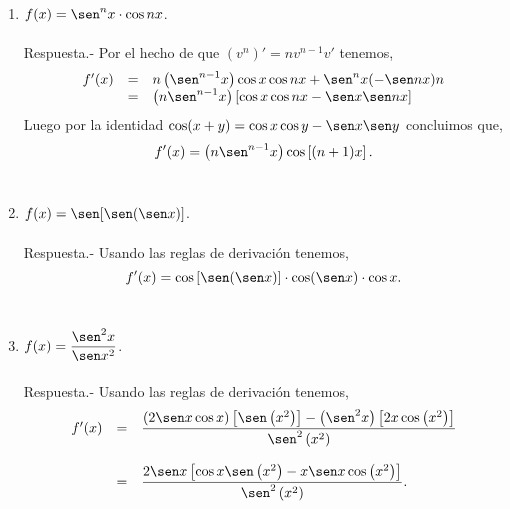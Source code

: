 \begin{enumerate}[\bfseries 1.]
    \item $f(x)=\sen^n x \cdot \cos nx$.\\\\
	Respuesta.- \; Por el hecho de que $(v^n)'=nv^{n-1}v'$ tenemos,
	$$\begin{array}{rcl}
	    f'(x)&=&n\left(\sen^{n-1}x\right)\cos x \cos nx + \sen^n x (-\sen nx)n\\
		 &=&\left(n\sen^{n-1}x\right)\left[\cos x \cos nx - \sen x \sen nx\right]\\
	 \end{array}$$
	 Luego por la identidad $\cos(x+y) = \cos x \cos y - \sen x \sen y$ concluimos que,
	 $$f'(x)=\left(n\sen^{n-1}x\right)\cos\left[(n+1)x\right].$$\\


    \item $f(x)=\sen [\sen(\sen x)]$.\\\\
	Respuesta.-\; Usando las reglas de derivación tenemos,
	$$f'(x)=\cos\left[\sen(\sen x)\right]\cdot \cos(\sen x)\cdot \cos x.$$\\

    \item $f(x)=\dfrac{\sen^2 x}{\sen x^2}$.\\\\
	Respuesta.- \; Usando las reglas de derivación tenemos,
	$$\begin{array}{rcl}
	    f'(x)&=&\dfrac{(2\sen x \cos x)\left[\sen\left(x^2\right)\right]-\left(\sen^2 x\right)\left[2x\cos \left(x^2\right)\right]}{\sen^2\left(x^2\right)}\\\\
		 &=&\dfrac{2\sen x\left[\cos x \sen \left(x^2\right)-x\sen x\cos \left(x^2\right)\right]}{\sen^2\left(x^2\right)}.\\\\
	\end{array}$$
	\vspace{.7cm}


\end{enumerate}
